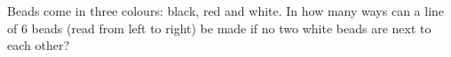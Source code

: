 Beads come in three colours: black, red and white. In how many ways can a line of $6$ beads (read from left to right) be made if no two white beads are next to each other?
